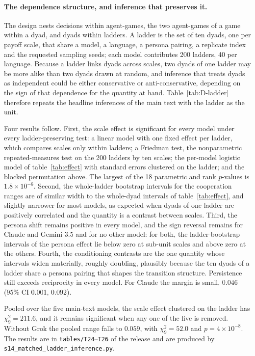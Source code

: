 \documentclass[openacc]{rsproca_new}
\newcommand{\ci}[2]{(95\% CI #1, #2)}
\newcommand{\rev}[1]{{\color{red}#1}}
\newcommand{\rev}[1]{#1}
\begin{document}
\rev{\paragraph{The dependence structure, and inference that preserves it.}
The design nests decisions within agent-games, the two agent-games of a game
within a dyad, and dyads within ladders. A ladder is the set of ten dyads, one
per payoff scale, that share a model, a language, a persona pairing, a
replicate index and the requested sampling seeds; each model contributes
200 ladders, 40 per language. Because a ladder links dyads across scales, two
dyads of one ladder may be more alike than two dyads drawn at random, and
inference that treats dyads as independent could be either conservative or
anti-conservative, depending on the sign of that dependence for the quantity
at hand. Table~\ref{tab:D-ladder} therefore repeats the headline inferences of
the main text with the ladder as the unit.

Four results follow. First, the scale effect is significant for every model
under every ladder-preserving test: a linear model with one fixed effect per
ladder, which compares scales only within ladders; a Friedman test, the
nonparametric repeated-measures test on the 200 ladders by ten scales; the
per-model logistic model of table~\ref{tab:effect} with standard errors
clustered on the ladder; and the blocked permutation above. The largest of the
18 parametric and rank $p$-values is $1.8\times10^{-6}$. Second, the whole-ladder
bootstrap intervals for the cooperation ranges are of similar width to the
whole-dyad intervals of table~\ref{tab:effect}, and slightly narrower for
most models, as expected when dyads of one ladder are positively correlated
and the quantity is a contrast between scales. Third, the persona shift
remains positive in every model, and the sign reversal remains for Claude and
Gemini 3.5 and for no other model: for both, the ladder-bootstrap intervals of
the persona effect lie below zero at sub-unit scales and above zero at the
others. Fourth, the conditioning contrasts are the one quantity whose
intervals widen materially, roughly doubling, plausibly because the ten dyads
of a ladder share a persona pairing that shapes the transition structure.
Persistence still exceeds reciprocity in every model. For Claude the margin
is small, $0.046$ \ci{0.001}{0.092}.

Pooled over the five main-text models, the scale effect clustered on the
ladder has $\chi^2_9 = 211.6$, and it remains significant when any one of the
five is removed. Without Grok the pooled range falls to $0.059$, with
$\chi^2_9 = 52.0$ and $p = 4\times10^{-8}$. The results are in
\texttt{tables/T24}--\texttt{T26} of the release and are produced by
\texttt{s14\_matched\_ladder\_inference.py}.}
\end{document}
